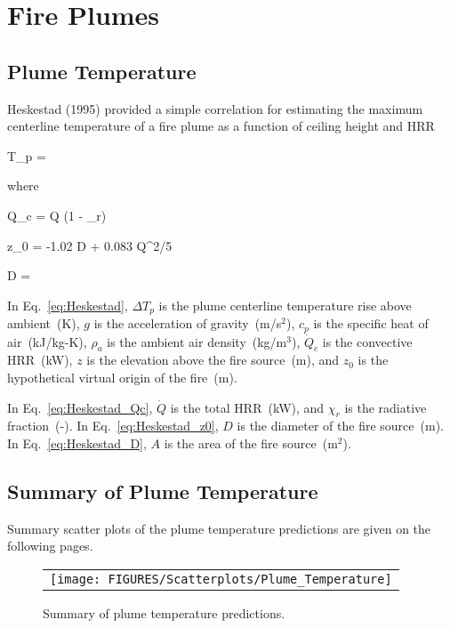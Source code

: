 \chapter{Fire Plumes}

\section{Plume Temperature}

Heskestad (1995) provided a simple correlation for estimating the maximum centerline temperature of a fire plume as a function of ceiling height and HRR

\be
\Delta T_p = 
\label{eq:Heskestad}
\ee

\noindent where

\be
\dot Q_c = \dot Q (1 - \chi_r)
\label{eq:Heskestad_Qc}
\ee

\be
z_0 = -1.02 D + 0.083 \dot Q^{2/5}
\label{eq:Heskestad_z0}
\ee

\be
D = 
\label{eq:Heskestad_D}
\ee

In Eq.~\ref{eq:Heskestad}, $\Delta T_p$ is the plume centerline temperature rise above ambient~(K), $g$ is the acceleration of gravity~(m/s$^2$), $c_p$ is the specific heat of air~(kJ/kg-K), $\rho_{a}$ is the ambient air density~(kg/m$^3$), $\dot Q_c$ is the convective HRR~(kW), $z$ is the elevation above the fire source~(m), and $z_0$ is the hypothetical virtual origin of the fire~(m).

In Eq.~\ref{eq:Heskestad_Qc}, $\dot Q$ is the total HRR~(kW), and $\chi_r$ is the radiative fraction~(-). In Eq.~\ref{eq:Heskestad_z0}, $D$ is the diameter of the fire source~(m). In Eq.~\ref{eq:Heskestad_D}, $A$ is the area of the fire source~(m$^2$).

\clearpage

\section{Summary of Plume Temperature}

Summary scatter plots of the plume temperature predictions are given on the following pages.

\begin{figure}[ht]
\begin{center}
\begin{tabular}{l}
\texttt{[image: FIGURES/Scatterplots/Plume\_Temperature]}
\end{tabular}
\end{center}
\caption[Summary of plume temperature predictions.]
{Summary of plume temperature predictions.}
\label{Plume_Summary}
\end{figure}

